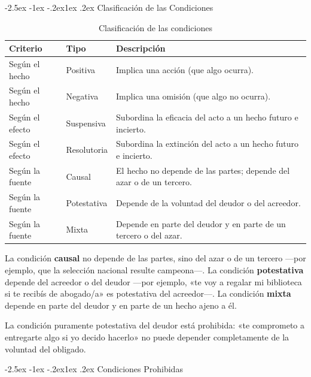 \documentclass[12pt,oneside]{book}
\makeatletter
\renewcommand\subsection{\@startsection{subsection}{2}{\z@}%
  {-2.5ex \@plus -1ex \@minus -.2ex}{1ex \@plus .2ex}%
  {\normalfont\normalsize\bfseries}}
\makeatother
\begin{document}
\subsection{Clasificación de las Condiciones}

\begin{table}[H]
\centering
\begin{tabularx}{\textwidth}{l l X}
\toprule
\textbf{Criterio} & \textbf{Tipo} & \textbf{Descripción} \\
\midrule
Según el hecho & Positiva & Implica una acción (que algo ocurra). \\
Según el hecho & Negativa & Implica una omisión (que algo no ocurra). \\
Según el efecto & Suspensiva & Subordina la eficacia del acto a un hecho futuro e incierto. \\
Según el efecto & Resolutoria & Subordina la extinción del acto a un hecho futuro e incierto. \\
Según la fuente & Causal & El hecho no depende de las partes; depende del azar o de un tercero. \\
Según la fuente & Potestativa & Depende de la voluntad del deudor o del acreedor. \\
Según la fuente & Mixta & Depende en parte del deudor y en parte de un tercero o del azar. \\
\bottomrule
\end{tabularx}
\caption{Clasificación de las condiciones}
\end{table}

La condición \textbf{causal} no depende de las partes, sino del azar o de un tercero ---por ejemplo, que la selección nacional resulte campeona---. La condición \textbf{potestativa} depende del acreedor o del deudor ---por ejemplo, «te voy a regalar mi biblioteca si te recibís de abogado/a» es potestativa del acreedor---. La condición \textbf{mixta} depende en parte del deudor y en parte de un hecho ajeno a él.

\begin{importante}
La condición puramente potestativa del deudor está prohibida: «te comprometo a entregarte algo si yo decido hacerlo» no puede depender completamente de la voluntad del obligado.
\end{importante}

\subsection{Condiciones Prohibidas}
\end{document}

